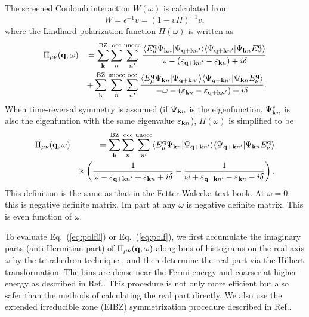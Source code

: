 \documentclass[a4paper,10pt,fleqn]{article}
\def\Psikn{\Psi_{{\bf k}n}}
\def\Psikn{{\Psi_{{\bf k}n}}}
\newcommand{\bfq}{{\bf q}}
\newcommand{\bfk}{{\bf k}}
\newcommand{\ispone}{}
\newcommand{\isptwo}{}
\newcommand{\req}[1]{\mbox{Eq.~(\ref{#1})}}
\begin{document}
The screened Coulomb interaction $W(\omega)$ is calculated from
\begin{equation}
 W = \epsilon^{-1} v = \left(1-v \Pi\right)^{-1} v,
\label{eq:defw}
\end{equation}
where the Lindhard polarization function $\Pi(\omega)$
is written as
\begin{eqnarray}
\Pi_{\mu \nu}({\bf q},\omega)
&&=
\sum^{\rm BZ}_{\bfk} \sum^{\rm occ}_{n \ispone} \sum^{\rm unocc}_{n'\isptwo}
\frac{
\langle E^{\bf q}_\mu \Psikn |\Psi_{{\bf q+k}n'} \rangle
\langle \Psi_{{\bf q+k}n'}| \Psikn E^{\bf q}_\nu \rangle
}{\omega-(\varepsilon_{{\bf q+k} n'\isptwo}-\varepsilon_{\bfk n\ispone})+i \delta} \nonumber\\
&&+ \sum^{\rm BZ}_{\bfk} \sum^{\rm  unocc}_{n \ispone} \sum^{\rm occ}_{n'\isptwo}
\frac{
\langle E^{\bf q}_\mu \Psi_{{\bf k}n} |\Psi_{{\bf q+k}n'} \rangle
\langle \Psi_{{\bf q+k}n'}| \Psi_{{\bf k}n} E^{\bf q}_\nu \rangle
}{-\omega-(\varepsilon_{\bfk n\ispone}-\varepsilon_{{\bf q+k} n'\isptwo})+i \delta}.
\label{eq:polf0}
\end{eqnarray}
When time-reversal symmetry is assumed (if $\Psi_{{\bf k}n}$ is the eigenfunction,
$\Psi^*_{{\bf k}n}$ is also the eigenfuntion with the same eigenvalue
$\varepsilon_{\bfk n}$),
$\Pi(\omega)$ is simplified to be
\begin{eqnarray}
\Pi_{\mu \nu}({\bf q},\omega)
&&=\sum^{\rm BZ}_{{\bf k}}  \sum^{\rm  occ}_{n} \sum^{\rm  unocc}_{n'}
\langle E^{\bf q}_\mu \Psi_{{\bf k}n} |\Psi_{{\bf q+k}n'} \rangle
\langle \Psi_{{\bf q+k}n'}| \Psi_{{\bf k}n} E^{\bf q}_\nu \rangle \nonumber \\
&& \times
\left(\frac{1}{\omega-\varepsilon_{{\bf q+k}n'}+\varepsilon_{{\bf k}n}+i \delta}
-\frac{1}{\omega+\varepsilon_{{\bf q+k}n'}-\varepsilon_{{\bf k}n}-i \delta}\right). \label{dieele}
\label{eq:polf}
\end{eqnarray}
This definition is the same as that in the Fetter-Walecka text book.
At $\omega=0$, this is negative definite matrix. 
Im part at any $\omega$ is negative definite matrix. This is even function of $\omega$.

To evaluate \req{eq:polf0} or \req{eq:polf},
we first accumulate the imaginary parts (anti-Hermitian part) of $\Pi_{\mu \nu}(\bfq,\omega)$
along bins of histograms on the real axis $\omega$
by the tetrahedron technique \cite{rath_generalized_1975},
and then determine the real part via the Hilbert transformation.
The bins are dense near the Fermi energy and coarser at higher energy as described in 
Ref.\cite{kotani_quasiparticle_2007}.
This procedure is not only more efficient but also safer than the methods
of calculating the real part directly. 
We also use the extended irreducible zone (EIBZ) 
symmetrization procedure described in Ref.\cite{friedrich_efficient_2010}.
\end{document}
